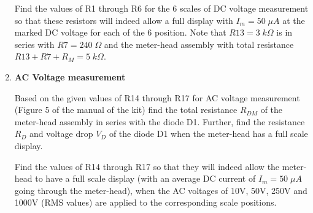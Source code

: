 \begin{enumerate}
  Find the values of R1 through R6 for the 6 scales of DC voltage measurement
  so that these resistors will indeed allow a full display with $I_m=50\;\mu A$ 
  at the marked DC voltage for each of the 6 position. Note that $R13=3\;k\Omega$ 
  is in series with $R7=240\;\Omega$ and the meter-head assembly with total 
  resistance $R13+R7+R_M=5\;k\Omega$. 
  
  \begin{comment}
  
  {\bf Solution:}

  As shown in Figure 4, the circuit for each scale of the DC voltage measurement 
  is a voltage divider with an internal resistance for the meter-head:
  \begin{itemize}
  \item 0.5V
    \[
    0.5\;\frac{5}{R6+5}=0.25,\;\;\;\;\;\;\;R6=5\;k\Omega
    \]
  \item 2.5V
    \[
    2.5\;\frac{5}{R5+R6+5}=0.25,\;\;\;\;\;\;\;R5=40\;k\Omega
    \]
  \item 10V
    \[
    10\;\frac{5}{R4+R5+R6+5}=0.25,\;\;\;\;\;\;\;R4=150\;k\Omega
    \]
  \item 50V
    \[
    50\;\frac{5}{R3+R4+R5+R6+5}=0.25,\;\;\;\;\;\;\;R3=800\;k\Omega
    \]
  \item 250V
    \[
    250\;\frac{5}{R2+R3+R4+R5+R6+5}=0.25,\;\;\;\;\;\;\;R2=4\;M\Omega
    \]
  \item 1000V
    \[
    1000\;\frac{5}{R1+R2+R3+R4+R5+R6+5}=0.25,\;\;\;\;\;\;\;R1=15\;M\Omega
    \]
  \end{itemize}
  \end{comment}


\item {\bf AC Voltage measurement}

  Based on the given values of R14 through R17 for AC voltage measurement
  (Figure 5 of the manual of the kit) find the total resistance $R_{DM}$
  of the meter-head assembly in series with the diode D1. Further, find 
  the resistance $R_D$ and voltage drop $V_D$ of the diode D1 when the 
  meter-head has a full scale display. 

  Find the values of R14 through R17 so that they will indeed allow the 
  meter-head to have a full scale display (with an average DC current of 
  $I_m=50\;\mu A$ going through the meter-head), when the AC voltages of
  10V, 50V, 250V and 1000V (RMS values) are applied to the corresponding 
  scale positions.

  \begin{comment}
  {\bf Solution:}


\end{comment}
\end{enumerate}
